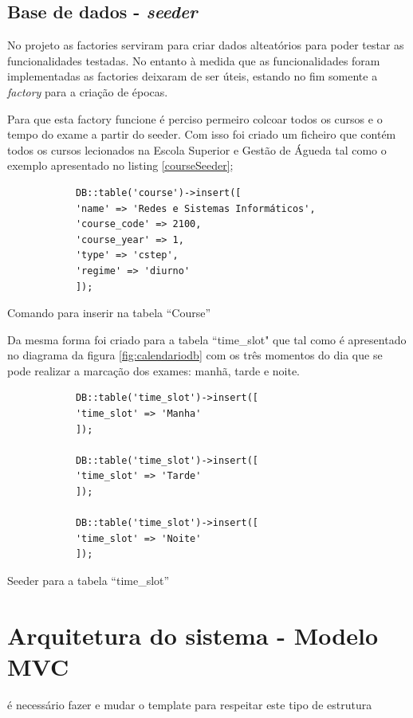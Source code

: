 \documentclass[11pt, twoside]{report}
\begin{document}
	
	\subsection{Base de dados - \textit{seeder}}
	
		No projeto as factories serviram para criar dados alteatórios para poder testar as funcionalidades testadas. No entanto à medida que as funcionalidades foram implementadas as factories deixaram de ser úteis, estando no fim somente a \textit{factory} para a criação de épocas.
		
		Para que esta factory funcione é perciso permeiro colcoar todos os cursos e o tempo do exame a partir do seeder. Com isso foi criado um ficheiro que contém todos os cursos lecionados na Escola Superior e Gestão de Águeda tal como o exemplo apresentado no listing \ref{courseSeeder};
		
		\begin{listing}[H]
		\begin{verbatim}
			DB::table('course')->insert([
			'name' => 'Redes e Sistemas Informáticos',
			'course_code' => 2100,
			'course_year' => 1,
			'type' => 'cstep',
			'regime' => 'diurno'
			]);
		\end{verbatim}
		\caption{Comando para inserir na tabela ``Course''}
		\label{courseSeeder}
		\end{listing}
	
	Da mesma forma foi criado para a tabela ``time\_slot" que tal como é apresentado no diagrama da figura \ref{fig:calendariodb} com os três momentos do dia que se pode realizar a marcação dos exames: manhã, tarde e noite. 
	
		\begin{listing}[H]
		\begin{verbatim}
			DB::table('time_slot')->insert([
			'time_slot' => 'Manha'
			]);
			
			DB::table('time_slot')->insert([
			'time_slot' => 'Tarde'
			]);
			
			DB::table('time_slot')->insert([
			'time_slot' => 'Noite'
			]);
		\end{verbatim}
		\caption{Seeder para a tabela ``time\_slot''}
		\label{timeslotSeeder}
	\end{listing}
	
	
	
	
	
	
	\section{Arquitetura do sistema - Modelo MVC}
	é necessário fazer e mudar o template para respeitar este tipo de estrutura
\end{document}
